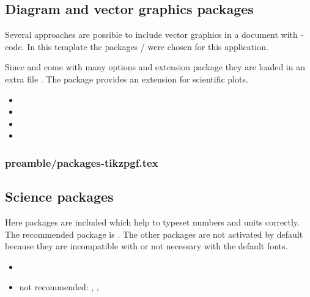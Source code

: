 
\subsection{Diagram and vector graphics packages}
Several approaches are possible to include vector graphics in a \latex document with \latex-code. In this template the packages / were chosen for this application.

Since  and  come with many options and 
extension package they are loaded in an extra file 
. The package  
provides an extension for scientific plots.

\begin{itemize}[noitemsep]
\item {}
\item {}
\item {}
\item {}
\end{itemize}



\subsubsection{preamble/packages-tikzpgf.tex}


\subsection{Science packages}
Here packages are included which help to typeset numbers and units correctly.
The recommended package is . The other packages are not activated by default because they are incompatible with  or not necessary with the default fonts.

\begin{itemize}[noitemsep]
\item {}
\item not recommended: , ,  
\end{itemize}

